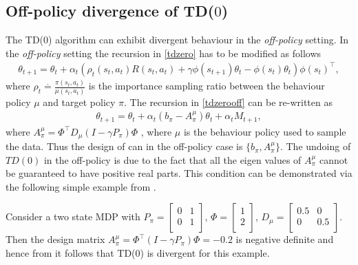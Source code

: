 \subsection{Off-policy divergence of TD($0$)}
The TD($0$) algorithm can exhibit divergent behaviour in the \emph{off-policy} setting. In the \emph{off-policy} setting the recursion in \eqref{tdzero} has to be modified as follows
\begin{align}\label{tdzerooff}
\theta_{t+1}=\theta_t+\alpha_t(\rho_t(s_t,a_t){R(s_t,a_t)+\gamma \phi(s_{t+1})\theta_t-\phi(s_t)\theta_t}){\phi(s_t)}^\top,
\end{align}
where $\rho_t\stackrel{\cdot}{=}\frac{\pi(s_t,a_t)}{\mu(s_t,a_t)}$ is the importance sampling ratio between the behaviour policy $\mu$ and target policy $\pi$. The recursion in \eqref{tdzerooff} can be re-written as
\begin{align}\label{tdzerooffsa}
\theta_{t+1}=\theta_t+\alpha_t(b_\pi-A^\mu_\pi)\theta_t+\alpha_t M_{t+1},
\end{align}
where $A^{\mu}_\pi=\Phi^\top D_\mu (I-\gamma P_\pi)\Phi$ , where $\mu$ is the behaviour policy used to sample the data. Thus the design of \tdo can in the off-policy case is $\{b_\pi,A^\mu_\pi\}$.
The undoing of $TD(0)$ in the off-policy is due to the fact that all the eigen values of $A^\mu_\pi$ cannot be guaranteed to have positive real parts. This condition can be demonstrated via the following simple example from \cite{}.
\begin{example}
Consider a two state MDP with $P_\pi=
\begin{bmatrix}
    0       & 1  \\
    0       & 1 \\
\end{bmatrix}$, $\Phi=\begin{bmatrix}
 1  \\
2 \\
\end{bmatrix}$, $D_\mu=
\begin{bmatrix}
    0.5       & 0  \\
    0       &0.5 \\
\end{bmatrix}$. Then the design matrix $A^\mu_\pi=\Phi^\top(I-\gamma P_\pi)\Phi=-0.2$ is negative definite and hence from  it follows that TD($0$) is divergent for this example.

\end{example}
%
